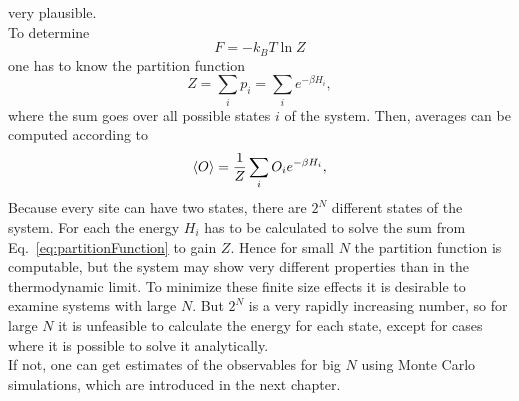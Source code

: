     very plausible.\\
    To determine
    \begin{equation}
        F=-k_{B}T \ln{Z}
    \end{equation}
    one has to know the partition function
    \begin{equation}
        Z = \sum_i p_i = \sum_i e^{-\beta H_i},
        \label{eq:partitionFunction}
    \end{equation}
    where the sum goes over all possible states \(i\) of the system.
    Then, averages can be computed according to
    \begin{equation}
        \left< O \right> = \frac{1}{Z} \sum_i O_i e^{-\beta H_i},
    \end{equation}
    Because every site can have two states, there are \(2^N\) different
    states of the system. For each the energy \(H_i\) has to be calculated
    to solve the sum from Eq.\ \eqref{eq:partitionFunction} to gain \(Z\).
    Hence for small \(N\) the partition function is computable, but the system
    may show very different properties than in the thermodynamic limit.
    To minimize these finite size effects it is desirable to examine
    systems with large \(N\). But \(2^N\) is a very rapidly increasing
    number, so for large \(N\) it is unfeasible to calculate the energy for each state, except
    for cases where it is possible to solve it analytically.\\
    If not, one can get estimates of the observables for big \(N\) using
    Monte Carlo simulations, which are introduced in the next chapter.\\

